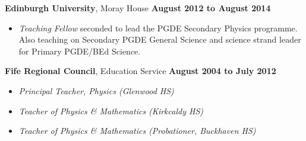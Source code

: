 \documentclass[10pt]{article}
\newenvironment{outerlist}[1][\enskip\textbullet]%
        {\begin{itemize}[#1]}{\end{itemize}%
         \vspace{-.6\baselineskip}}
\newenvironment{innerlist}[1][\enskip\textbullet]%
        {\begin{compactitem}[#1]}{\end{compactitem}}
\newcommand{\blankline}{\quad\pagebreak[2]}
\begin{document}
%
%

\blankline

\textbf{Edinburgh University}, Moray House       \hfill \textbf{August 2012 to August 2014}

\begin{outerlist}

\item[] \textit{Teaching Fellow} seconded to lead the PGDE Secondary Physics programme. Also teaching on  Secondary PGDE General Science and science strand leader for Primary PGDE/BEd Science.
\end{outerlist}

\blankline

\textbf{Fife Regional Council}, Education Service
     \hfill \textbf{August 2004 to July 2012}
     
     
\begin{outerlist}

\item[] \textit{Principal Teacher, Physics (Glenwood HS) }   %
\item[] \textit{Teacher of Physics \& Mathematics (Kirkcaldy HS)}  %
\item[] \textit{Teacher of Physics \& Mathematics (Probationer, Buckhaven HS)}  %
\end{outerlist}
\end{document}
